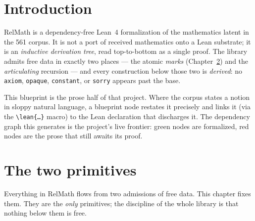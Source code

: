 %
%
%

\chapter{Introduction}
\label{ch:intro}

RelMath is a dependency-free Lean~4 formalization of the mathematics latent in the
561 corpus. It is not a port of received mathematics onto a Lean substrate; it is an
\emph{inductive derivation tree}, read top-to-bottom as a single proof. The library
admits free data in exactly two places --- the atomic \emph{marks}
(Chapter~\ref{ch:primitives}) and the \emph{articulating} recursion --- and every
construction below those two is \emph{derived}: no \texttt{axiom}, \texttt{opaque},
\texttt{constant}, or \texttt{sorry} appears past the base.

This blueprint is the prose half of that project. Where the corpus states a notion in
sloppy natural language, a blueprint node restates it precisely and links it (via the
\texttt{\textbackslash lean\{\dots\}} macro) to the Lean declaration that discharges it.
The dependency graph this generates is the project's live frontier: green nodes are
formalized, red nodes are the prose that still awaits its proof.

\chapter{The two primitives}
\label{ch:primitives}

Everything in RelMath flows from two admissions of free data. This chapter fixes
them. They are the \emph{only} primitives; the discipline of the whole library is
that nothing below them is free.

